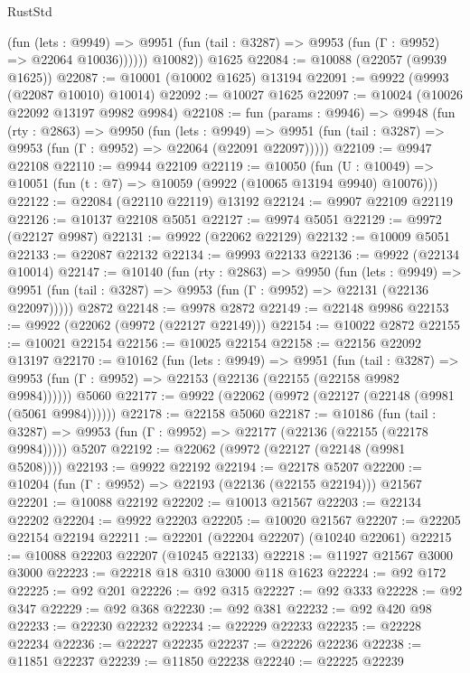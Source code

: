 \begin{lexlean}{RustStd}
\begin{coremodule}
              (fun (lets : @9949) =>
              @9951 (fun (tail : @3287) => @9953 (fun (Γ : @9952) => @22064 @10036))))))
        @10082))
    @1625
@22084 := @10088 (@22057 (@9939 @1625))
@22087 := @10001 (@10002 @1625) @13194
@22091 := @9922 (@9993 (@22087 @10010) @10014)
@22092 := @10027 @1625
@22097 := @10024 (@10026 @22092 @13197 @9982 @9984)
@22108 := fun (params : @9946) =>
  @9948
    (fun (rty : @2863) =>
    @9950
      (fun (lets : @9949) =>
      @9951 (fun (tail : @3287) => @9953 (fun (Γ : @9952) => @22064 (@22091 @22097)))))
@22109 := @9947 @22108
@22110 := @9944 @22109
@22119 := @10050
    (fun (U : @10049) => @10051 (fun (t : @7) => @10059 (@9922 (@10065 @13194 @9940) @10076)))
@22122 := @22084 (@22110 @22119) @13192
@22124 := @9907 @22109 @22119
@22126 := @10137 @22108 @5051
@22127 := @9974 @5051
@22129 := @9972 (@22127 @9987)
@22131 := @9922 (@22062 @22129)
@22132 := @10009 @5051
@22133 := @22087 @22132
@22134 := @9993 @22133
@22136 := @9922 (@22134 @10014)
@22147 := @10140
    (fun (rty : @2863) =>
    @9950
      (fun (lets : @9949) =>
      @9951 (fun (tail : @3287) => @9953 (fun (Γ : @9952) => @22131 (@22136 @22097)))))
    @2872
@22148 := @9978 @2872
@22149 := @22148 @9986
@22153 := @9922 (@22062 (@9972 (@22127 @22149)))
@22154 := @10022 @2872
@22155 := @10021 @22154
@22156 := @10025 @22154
@22158 := @22156 @22092 @13197
@22170 := @10162
    (fun (lets : @9949) =>
    @9951
      (fun (tail : @3287) =>
      @9953 (fun (Γ : @9952) => @22153 (@22136 (@22155 (@22158 @9982 @9984))))))
    @5060
@22177 := @9922 (@22062 (@9972 (@22127 (@22148 (@9981 (@5061 @9984))))))
@22178 := @22158 @5060
@22187 := @10186
    (fun (tail : @3287) => @9953 (fun (Γ : @9952) => @22177 (@22136 (@22155 (@22178 @9984)))))
    @5207
@22192 := @22062 (@9972 (@22127 (@22148 (@9981 @5208))))
@22193 := @9922 @22192
@22194 := @22178 @5207
@22200 := @10204 (fun (Γ : @9952) => @22193 (@22136 (@22155 @22194))) @21567
@22201 := @10088 @22192
@22202 := @10013 @21567
@22203 := @22134 @22202
@22204 := @9922 @22203
@22205 := @10020 @21567
@22207 := @22205 @22154 @22194
@22211 := @22201 (@22204 @22207) (@10240 @22061)
@22215 := @10088 @22203 @22207 (@10245 @22133)
@22218 := @11927 @21567 @3000 @3000
@22223 := @22218 @18 @310 @3000 @118 @1623
@22224 := @92 @172
@22225 := @92 @201
@22226 := @92 @315
@22227 := @92 @333
@22228 := @92 @347
@22229 := @92 @368
@22230 := @92 @381
@22232 := @92 @420 @98
@22233 := @22230 @22232
@22234 := @22229 @22233
@22235 := @22228 @22234
@22236 := @22227 @22235
@22237 := @22226 @22236
@22238 := @11851 @22237
@22239 := @11850 @22238
@22240 := @22225 @22239

\end{coremodule}
\end{lexlean}
